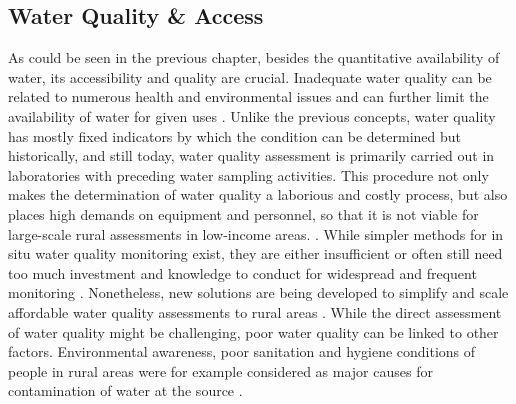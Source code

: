 
\subsection{Water Quality \& Access}\label{subsec:water_quality}

As could be seen in the previous chapter, besides the quantitative availability of water, its accessibility and quality are crucial. Inadequate water quality can be related to numerous health and environmental issues and can further limit the availability of water for given uses \autocite{rcrcFORECASTBASEDFINANCINGEARLY2020, faoCopingWaterScarcity2012}. Unlike the previous concepts, water quality has mostly fixed indicators by which the condition can be determined but historically, and still today, water quality assessment is primarily carried out in laboratories with preceding water sampling activities. This procedure not only makes the determination of water quality a laborious and costly process, but also places high demands on equipment and personnel, so that it is not viable for large-scale rural assessments in low-income areas. \autocite{tariqOpenSourceWater2021,worldmeteorologicalorganizationPlanningWaterqualityMonitoring2013}. While simpler methods for in situ water quality monitoring exist, they are either insufficient or often still need too much investment and knowledge to conduct for widespread and frequent monitoring \autocite{worldmeteorologicalorganizationPlanningWaterqualityMonitoring2013}. Nonetheless, new solutions are being developed to simplify and scale affordable water quality assessments to rural areas \autocite{ighaloComprehensiveReviewWater2020,tariqOpenSourceWater2021}. While the direct assessment of water quality might be challenging, poor water quality can be linked to other factors. Environmental awareness, poor sanitation and hygiene conditions of people in rural areas were for example considered as major causes for contamination of water at the source \autocite{zamxakaMicrobiologicalPhysicochemicalAssessment2004}.


